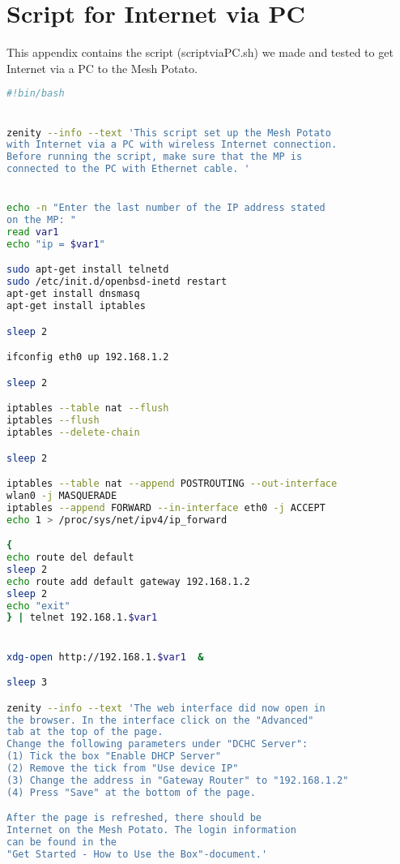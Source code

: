 \chapter{Script for Internet via PC}
\label{chp:appendixD} 

This appendix contains the script (scriptviaPC.sh) we made and tested to get Internet via a PC to the Mesh Potato.  

\begin{framed}
\noindent
\lstset{showstringspaces=false}
\begin{lstlisting}[language=sh]
#!bin/bash


zenity --info --text 'This script set up the Mesh Potato 
with Internet via a PC with wireless Internet connection. 
Before running the script, make sure that the MP is
connected to the PC with Ethernet cable. '


echo -n "Enter the last number of the IP address stated
on the MP: "
read var1 
echo "ip = $var1"

sudo apt-get install telnetd
sudo /etc/init.d/openbsd-inetd restart
apt-get install dnsmasq
apt-get install iptables 

sleep 2

ifconfig eth0 up 192.168.1.2

sleep 2

iptables --table nat --flush
iptables --flush
iptables --delete-chain

sleep 2

iptables --table nat --append POSTROUTING --out-interface
wlan0 -j MASQUERADE
iptables --append FORWARD --in-interface eth0 -j ACCEPT
echo 1 > /proc/sys/net/ipv4/ip_forward

{
echo route del default
sleep 2
echo route add default gateway 192.168.1.2 
sleep 2
echo "exit"
} | telnet 192.168.1.$var1 


xdg-open http://192.168.1.$var1  &

sleep 3

zenity --info --text 'The web interface did now open in 
the browser. In the interface click on the "Advanced" 
tab at the top of the page. 
Change the following parameters under "DCHC Server": 
(1) Tick the box "Enable DHCP Server"
(2) Remove the tick from "Use device IP"
(3) Change the address in "Gateway Router" to "192.168.1.2"
(4) Press "Save" at the bottom of the page. 

After the page is refreshed, there should be 
Internet on the Mesh Potato. The login information 
can be found in the 
"Get Started - How to Use the Box"-document.'

\end{lstlisting}
\end{framed}

